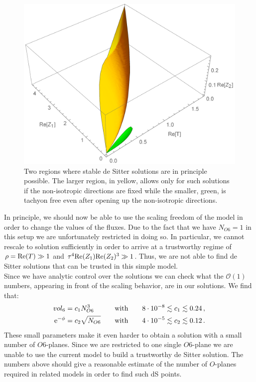 \documentclass[a4paper,12pt]{report}
\newcommand{\bea}{\begin{equation}\begin{aligned}}
\newcommand{\eea}{\end{aligned}\end{equation}}
\def\rme{{\rm e}}
\def\rmre{{\rm Re}}
\begin{document}
\begin{figure}[htb]
     \centering
     \includegraphics[scale=0.6]{tworegs.pdf}
     \caption{Two regions where stable de Sitter solutions are in principle possible. The larger region, in yellow, allows only for such solutions if the non-isotropic directions are fixed while the smaller, green, is tachyon free even after opening up the non-isotropic directions.}
     \label{fig:tworeg}
\end{figure}
In principle, we should now be able to use the scaling freedom of the model in order to change the values of the fluxes. Due to the fact that we have $N_{O6} = 1$ in this setup we are unfortunately restricted in doing so. In particular, we cannot rescale to solution sufficiently in order to arrive at a trustworthy regime of $\rho = \rmre(T) \gg 1 $ and $\tau^ 4 \rmre(Z_1) \rmre(Z_2)^ 3 \gg 1$. Thus, we are not able to find de Sitter solutions that can be trusted in this simple model.\\
Since we have analytic control over the solutions we can check what the $\mathcal{O}(1)$ numbers, appearing in front of the scaling behavior, are in our solutions. We find that:
\bea 
vol_6 &= c_1 N^ 3_{O6} \qquad\quad \text{with} \qquad 8 \cdot 10^ {-8} \lesssim c_1 \lesssim 0.24\,,\\
\rme^ {-\phi} &= c_2 \sqrt{N_{O6}} \qquad \text{with} \qquad 4 \cdot 10^ {-5} \lesssim c_2 \lesssim 0.12\,.
\eea
These small parameters make it even harder to obtain a solution with a small number of $O6$-planes. Since we are restricted to one single $O6$-plane we are unable to use the current model to build a trustworthy de Sitter solution. The numbers above should give a reasonable estimate of the number of $O$-planes required in related models in order to find such dS points.
\end{document}
